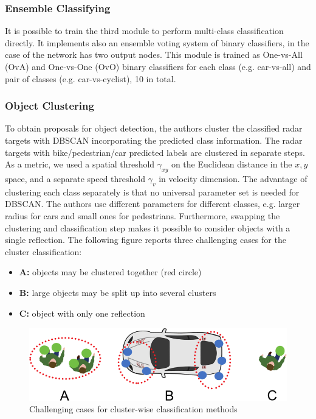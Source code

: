 \subsubsection{Ensemble Classifying}\label{header-n377}

It is possible to train the third module to perform multi-class
classification directly. It implements also an ensemble voting system of
binary classifiers, in the case of the network has two output nodes.
This module is trained as One-vs-All (OvA) and One-vs-One (OvO) binary
classifiers for each class (e.g. car-vs-all) and pair of classes (e.g.
car-vs-cyclist), 10 in total.

\subsubsection{Object Clustering}\label{header-n379}

To obtain proposals for object detection, the authors cluster the
classified radar targets with DBSCAN incorporating the predicted class
information. The radar targets with bike/pedestrian/car predicted labels
are clustered in separate steps. As a metric, we used a spatial
threshold $\gamma_{xy}$ on the Euclidean distance in the $x, y$
space, and a separate speed threshold $\gamma_v$ in velocity
dimension. The advantage of clustering each class separately is that no
universal parameter set is needed for DBSCAN. The authors use different
parameters for different classes, e.g. larger radius for cars and small
ones for pedestrians. Furthermore, swapping the clustering and
classification step makes it possible to consider objects with a single
reflection. The following figure reports three challenging cases for the
cluster classification:

\begin{itemize}
\item
  \textbf{A:} objects may be clustered together (red circle)
\item
  \textbf{B:} large objects may be split up into several clusters
\item
  \textbf{C:} object with only one reflection
\end{itemize}

\begin{figure}[h!]
\centering
\includegraphics[width=0.95\linewidth]{images/clusteringdiff.png}
\caption{Challenging cases for cluster-wise classification methods}
\end{figure}

